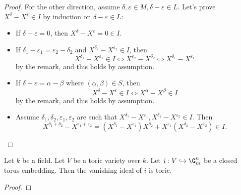 \begin{proof}
  For the other direction, assume $\delta, \varepsilon \in M, \delta - \varepsilon \in L$.
  Let's prove $X^\delta - X^\varepsilon \in I$ by induction on $\delta - \varepsilon \in L$:
  \begin{itemize}
    \item If $\delta - \varepsilon = 0$, then $X^\delta - X^\varepsilon = 0 \in I$.
    \item If $\delta_1 - \varepsilon_1 = \varepsilon_2 - \delta_2$
      and $X^{\delta_2} - X^{\varepsilon_2} \in I$, then
      \[
        X^{\delta_1} - X^{\varepsilon_1} \in I \iff X^{\varepsilon_2} - X^{\delta_2}
          \iff X^{\delta_1} - X^{\varepsilon_1}
      \]
      by the remark, and this holds by assumption.
    \item If $\delta - \varepsilon = \alpha - \beta$ where $(\alpha, \beta) \in S$, then
      \[
        X^\delta - X^\varepsilon \in I \iff X^\alpha - X^\beta \in I
      \]
      by the remark, and this holds by assumption.
    \item Assume $\delta_1, \delta_2, \varepsilon_1, \varepsilon_2$ are such that
      $X^{\delta_1} - X^{\varepsilon_1}, X^{\delta_2} - X^{\varepsilon_2} \in I$.
      Then
      \[
        X^{\delta_1 + \delta_2} - X^{\varepsilon_1 + \varepsilon_2}
          = (X^{\delta_1} - X^{\varepsilon_1})X^{\delta_2}
            + X^{\varepsilon_1}(X^{\delta_2} - X^{\varepsilon_2})
          \in I.
      \]
  \end{itemize}
\end{proof}


\begin{proposition}
  \label{5-3-van-tor-emb}

  Let $k$ be a field.
  Let $V$ be a toric variety over $k$.
  Let $i : V \hookrightarrow \G_m^n$ be a closed torus embedding.
  Then the vanishing ideal of $i$ is toric.
\end{proposition}
\begin{proof}


\end{proof}
